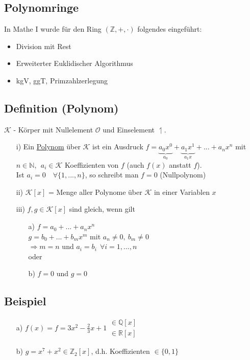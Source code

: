 \documentclass[a4paper, 12pt,titlepage, pdf, headsepline]{scrartcl}
\newcommand{\N}{\mathds{N}}
\newcommand{\uline}[1]{\underline{#1}}
\renewcommand{\>}{\rightarrow}
\renewcommand{\*}{\cdot}
\begin{document}
		      	\subsection*{Polynomringe}
		      	In Mathe I wurde für den Ring $(\mathds{Z},+,\*)$ folgendes eingeführt:
		      	\begin{itemize}
		      		\item Division mit Rest
		      		\item Erweiterter Euklidischer Algorithmus
		      		\item kgV, ggT, Primzahlzerlegung
		      	\end{itemize}
		      	\subsection{Definition (Polynom)}
		      	$\mathcal{K}$ - Körper mit Nullelement $\mathcal{O}$ und Einselement $\upharpoonleft$.
		      	\begin{itemize}
		      		\item[i)] Ein \uline{Polynom} über $\mathcal{K}$ ist ein Ausdruck $f = \underbrace{a_0x^0}_{a_0} + \underbrace{a_1x^1}_{a_1x} + ... + a_nx^n $ mit $ n \in \N, ~~a_i \in \mathcal{K}$ Koeffizienten von $f$ (auch $f(x)$ anstatt $f$).\\
		      		      Ist $a_i = 0 \quad\forall \{1,...,n\}$, so schreibt man $f= 0$ (Nullpolynom)
		      		\item[ii)] $\mathcal{K}[x]$ = Menge aller Polynome über $\mathcal{K}$ in einer Variablen $x$
		      		\item[iii)] $f,g \in \mathcal{K}[x]$ sind gleich, wenn gilt
		      		      \begin{itemize}
		      		      	\item[a)]  $f = a_0 + ... + a_n x^n$ \\
		      		      	      $g = b_0 +...+ b_mx^m$ mit $a_n \neq 0, ~b_m \neq 0$ \\
		      		      	      $\Rightarrow m = n$ und $a_i = b_i ~~\forall i = 1,...,n$\\
		      		      	      oder
		      		      	\item[b)] $f= 0$ und $g= 0$
		      		      \end{itemize}
		      	\end{itemize}
		      	\subsection{Beispiel}
		      	\begin{itemize}
		      		\item[a)] $f(x) = f = 3x^2 - \frac{2}{3}x +1  \substack{\in\mathds{Q}[x]\\ \in \mathds{R}[x]}$
		      		\item[b)] $g = x^7 + x^2 \in \mathds{Z}_2[x]$, d.h. Koeffizienten $\in \{0,1\}$
		      	\end{itemize}
\end{document}
